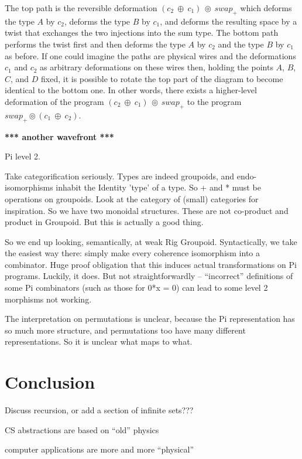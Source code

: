 \documentclass{article}
\newcommand{\amr}[1]{\fbox{Amr says:} \textbf{#1}}
\begin{document}
The top path is the reversible deformation
$(c_2~\oplus~c_1)~\circledcirc~\mathit{swap}_{+}$ which deforms the
type $A$ by $c_2$, deforms the type $B$ by $c_1$, and deforms the
resulting space by a twist that exchanges the two injections into the
sum type. The bottom path performs the twist first and then deforms
the type $A$ by $c_2$ and the type $B$ by $c_1$ as before. If one
could imagine the paths are physical wires and the deformations $c_1$
and $c_2$ as arbitrary deformations on these wires then, holding the
points $A$, $B$, $C$, and $D$ fixed, it is possible to rotate the top
part of the diagram to become identical to the bottom one. In other
words, there exists a higher-level deformation of the program
$(c_2~\oplus~c_1)~\circledcirc~\mathit{swap}_{+}$ to the program
$\mathit{swap}_{+} \circledcirc (c_1~\oplus~c_2)$.

\amr{*** another wavefront ***}


Pi level 2.

Take categorification seriously. Types are indeed groupoids, and
endo-isomorphisms inhabit the Identity 'type' of a type. So + and *
must be operations on groupoids. Look at the category of (small)
categories for inspiration. So we have two monoidal structures.
These are not co-product and product in Groupoid. But this is actually
a good thing.

So we end up looking, semantically, at weak Rig Groupoid. Syntactically,
we take the easiest way there: simply make every coherence isomorphism into
a combinator. Huge proof obligation that this induces actual transformations
on Pi programs. Luckily, it does.  But not straightforwardly -- ``incorrect''
definitions of some Pi combinators (such as those for 0*x = 0) can lead to
some level 2 morphisms not working. 

The interpretation on permutations is unclear, because the Pi representation
has so much more structure, and permutations too have many different 
representations. So it is unclear what maps to what.

\section{Conclusion}

Discuss recursion, or add a section of infinite sets???

CS abstractions are based on ``old'' physics

computer applications are more and more ``physical''
\end{document}
